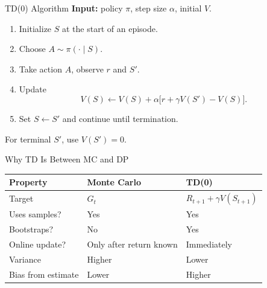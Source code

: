 \documentclass[aspectratio=169]{beamer}
\begin{document}
\begin{frame}{TD(0) Algorithm}
\small
\textbf{Input:} policy $\pi$, step size $\alpha$, initial $V$.

\vspace{0.5em}
\begin{enumerate}
    \item Initialize $S$ at the start of an episode.
    \item Choose $A\sim\pi(\cdot\mid S)$.
    \item Take action $A$, observe $r$ and $S'$.
    \item Update
    \[
    V(S)\leftarrow V(S)+\alpha\bigl[r+\gamma V(S')-V(S)\bigr].
    \]
    \item Set $S\leftarrow S'$ and continue until termination.
\end{enumerate}

\vspace{0.4em}
For terminal $S'$, use $V(S')=0$.
\end{frame}

\begin{frame}{Why TD Is Between MC and DP}
\small
\begin{tabular}{>{\raggedright\arraybackslash}p{}
                >{\raggedright\arraybackslash}p{}
                >{\raggedright\arraybackslash}p{}}
\toprule
Property & Monte Carlo & TD(0) \\
\midrule
Target & $G_t$ & $R_{t+1}+\gamma V(S_{t+1})$ \\
Uses samples? & Yes & Yes \\
Bootstraps? & No & Yes \\
Online update? & Only after return known & Immediately \\
Variance & Higher & Lower \\
Bias from estimate & Lower & Higher \\
\bottomrule
\end{tabular}
\end{frame}
\end{document}
